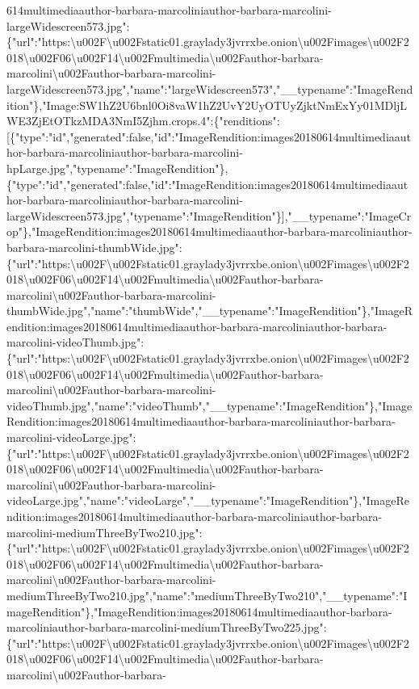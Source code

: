 614multimediaauthor-barbara-marcoliniauthor-barbara-marcolini-largeWidescreen573.jpg":\{"url":"https:\textbackslash{}u002F\textbackslash{}u002Fstatic01.graylady3jvrrxbe.onion\textbackslash{}u002Fimages\textbackslash{}u002F2018\textbackslash{}u002F06\textbackslash{}u002F14\textbackslash{}u002Fmultimedia\textbackslash{}u002Fauthor-barbara-marcolini\textbackslash{}u002Fauthor-barbara-marcolini-largeWidescreen573.jpg","name":"largeWidescreen573","\_\_typename":"ImageRendition"\},"Image:SW1hZ2U6bnl0Oi8vaW1hZ2UvY2UyOTUyZjktNmExYy01MDljLWE3ZjEtOTkzMDA3NmI5Zjhm.crops.4":\{"renditions":{[}\{"type":"id","generated":false,"id":"ImageRendition:images20180614multimediaauthor-barbara-marcoliniauthor-barbara-marcolini-hpLarge.jpg","typename":"ImageRendition"\},\{"type":"id","generated":false,"id":"ImageRendition:images20180614multimediaauthor-barbara-marcoliniauthor-barbara-marcolini-largeWidescreen573.jpg","typename":"ImageRendition"\}{]},"\_\_typename":"ImageCrop"\},"ImageRendition:images20180614multimediaauthor-barbara-marcoliniauthor-barbara-marcolini-thumbWide.jpg":\{"url":"https:\textbackslash{}u002F\textbackslash{}u002Fstatic01.graylady3jvrrxbe.onion\textbackslash{}u002Fimages\textbackslash{}u002F2018\textbackslash{}u002F06\textbackslash{}u002F14\textbackslash{}u002Fmultimedia\textbackslash{}u002Fauthor-barbara-marcolini\textbackslash{}u002Fauthor-barbara-marcolini-thumbWide.jpg","name":"thumbWide","\_\_typename":"ImageRendition"\},"ImageRendition:images20180614multimediaauthor-barbara-marcoliniauthor-barbara-marcolini-videoThumb.jpg":\{"url":"https:\textbackslash{}u002F\textbackslash{}u002Fstatic01.graylady3jvrrxbe.onion\textbackslash{}u002Fimages\textbackslash{}u002F2018\textbackslash{}u002F06\textbackslash{}u002F14\textbackslash{}u002Fmultimedia\textbackslash{}u002Fauthor-barbara-marcolini\textbackslash{}u002Fauthor-barbara-marcolini-videoThumb.jpg","name":"videoThumb","\_\_typename":"ImageRendition"\},"ImageRendition:images20180614multimediaauthor-barbara-marcoliniauthor-barbara-marcolini-videoLarge.jpg":\{"url":"https:\textbackslash{}u002F\textbackslash{}u002Fstatic01.graylady3jvrrxbe.onion\textbackslash{}u002Fimages\textbackslash{}u002F2018\textbackslash{}u002F06\textbackslash{}u002F14\textbackslash{}u002Fmultimedia\textbackslash{}u002Fauthor-barbara-marcolini\textbackslash{}u002Fauthor-barbara-marcolini-videoLarge.jpg","name":"videoLarge","\_\_typename":"ImageRendition"\},"ImageRendition:images20180614multimediaauthor-barbara-marcoliniauthor-barbara-marcolini-mediumThreeByTwo210.jpg":\{"url":"https:\textbackslash{}u002F\textbackslash{}u002Fstatic01.graylady3jvrrxbe.onion\textbackslash{}u002Fimages\textbackslash{}u002F2018\textbackslash{}u002F06\textbackslash{}u002F14\textbackslash{}u002Fmultimedia\textbackslash{}u002Fauthor-barbara-marcolini\textbackslash{}u002Fauthor-barbara-marcolini-mediumThreeByTwo210.jpg","name":"mediumThreeByTwo210","\_\_typename":"ImageRendition"\},"ImageRendition:images20180614multimediaauthor-barbara-marcoliniauthor-barbara-marcolini-mediumThreeByTwo225.jpg":\{"url":"https:\textbackslash{}u002F\textbackslash{}u002Fstatic01.graylady3jvrrxbe.onion\textbackslash{}u002Fimages\textbackslash{}u002F2018\textbackslash{}u002F06\textbackslash{}u002F14\textbackslash{}u002Fmultimedia\textbackslash{}u002Fauthor-barbara-marcolini\textbackslash{}u002Fauthor-barbara-